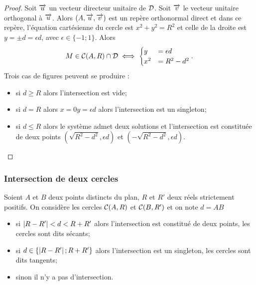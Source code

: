 \begin{proof}
  Soit \(\overrightarrow{u}\) un vecteur directeur unitaire de \(\mathcal{D}\). Soit \(\overrightarrow{v}\) le 
  vecteur unitaire orthogonal à \(\overrightarrow{u}\). Alors \((A , \overrightarrow{u} , \overrightarrow{v})\) est un 
  repère orthonormal direct et dans ce repère, l'équation cartésienne du 
  cercle est \(x^2 + y^2 = R^2\) et celle de la droite est \(y = \pm d = 
  \epsilon d\), avec \(\epsilon \in \{-1; 1\}\). Alors \begin{equation}
    M \in \mathcal{C}(A,R) \cap \mathcal{D} \iff  \begin{cases} y& = \epsilon d \\ x^2& = 
      R^2 - d^2
    \end{cases}.
    \end{equation}
    Trois cas de figures peuvent se produire :
    \begin{itemize}
      \item si \(d \geqslant R\) alors l'intersection est vide;
      \item si \(d = R\) alors \(x = 0 y = \epsilon d\) alors l'intersection 
        est un singleton;
      \item si \(d \leqslant R\) alors le système admet deux solutions et 
        l'intersection est constituée de deux points \((\sqrt{R^2 - 
        d^2},\epsilon d)\) et \((-\sqrt{R^2 - d^2},\epsilon d)\).
    \end{itemize}
\end{proof}

\subsubsection{Intersection de deux cercles}

\begin{prop}
  Soient \(A\) et \(B\) deux points distincts du plan, \(R\) et \(R'\) deux 
  réels strictement positifs. On considère les cercles \(\mathcal{C}(A,R)\) et 
  \(\mathcal{C}(B,R')\) et on note \(d = AB\)
  \begin{itemize}
    \item si \(\left\lvert R - R'\right\rvert<d<R + R'\) alors l'intersection est constitué de 
      deux points, les cercles sont dits sécants;
    \item si \(d \in \{\left\lvert R - R'\right\rvert;R + R'\}\) alors l'intersection est un 
      singleton, les cercles sont dits tangents;
    \item sinon il n'y a pas d'intersection.
  \end{itemize}
\end{prop}

